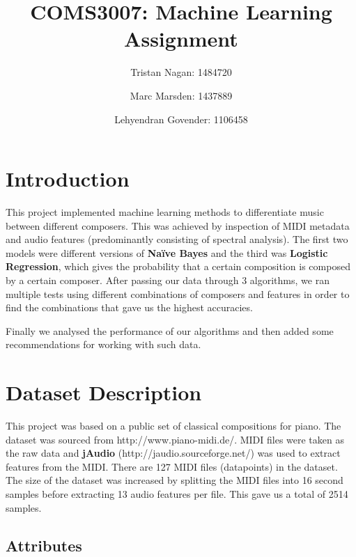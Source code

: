 \documentclass[11pt]{article}
\title{COMS3007: Machine Learning Assignment}
\author{    Tristan Nagan: 1484720 \and Marc Marsden: 1437889 \and Lehyendran Govender: 1106458}
\begin{document}
    
    
    \maketitle
    
    \newpage
    
    \tableofcontents
    
    \listoffigures
    
    \newpage


    \section{Introduction}\label{introduction}

This project implemented machine learning methods to differentiate music
between different composers. This was achieved by inspection of MIDI
metadata and audio features (predominantly consisting of spectral
analysis). The first two models were different versions of \textbf{Naïve
Bayes} and the third was \textbf{Logistic Regression}, which gives the
probability that a certain composition is composed by a certain
composer. After passing our data through 3 algorithms, we ran multiple
tests using different combinations of composers and features in order to
find the combinations that gave us the highest accuracies.

Finally we analysed the performance of our algorithms and then added
some recommendations for working with such data.

    \section{Dataset Description}\label{dataset-description}

This project was based on a public set of classical compositions for
piano. The dataset was sourced from http://www.piano-midi.de/. MIDI
files were taken as the raw data and \textbf{jAudio}
(http://jaudio.sourceforge.net/) was used to extract features from the
MIDI. There are 127 MIDI files (datapoints) in the dataset. The size of
the dataset was increased by splitting the MIDI files into 16 second
samples before extracting 13 audio features per file. This gave us a
total of 2514 samples.

\subsection{Attributes}\label{attributes}
\end{document}

